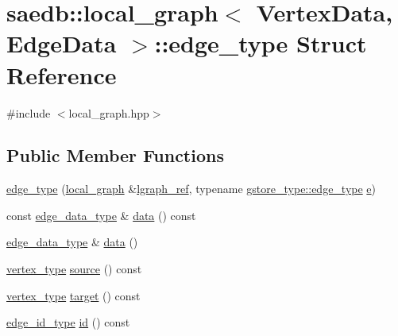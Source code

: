\hypertarget{structsaedb_1_1local__graph_1_1edge__type}{\section{saedb\-:\-:local\-\_\-graph$<$ Vertex\-Data, Edge\-Data $>$\-:\-:edge\-\_\-type Struct Reference}
\label{da/d9c/structsaedb_1_1local__graph_1_1edge__type}
}


{\ttfamily \#include $<$local\-\_\-graph.\-hpp$>$}

\subsection*{Public Member Functions}
\begin{DoxyCompactItemize}
\item 
\hyperlink{structsaedb_1_1local__graph_1_1edge__type_a9d564cdbeaada46731ad31388589c3d0}{edge\-\_\-type} (\hyperlink{classsaedb_1_1local__graph}{local\-\_\-graph} \&\hyperlink{structsaedb_1_1local__graph_1_1edge__type_a10710816a9c91ab177cdcbdc1b02c13b}{lgraph\-\_\-ref}, typename \hyperlink{classsaedb_1_1graph__storage_1_1edge__type}{gstore\-\_\-type\-::edge\-\_\-type} \hyperlink{structsaedb_1_1local__graph_1_1edge__type_acb4410e19f8158ef74a2df433c104fea}{e})
\item 
const \hyperlink{classsaedb_1_1local__graph_a40ea4338f0e7fcd205b83b41e3f86e8c}{edge\-\_\-data\-\_\-type} \& \hyperlink{structsaedb_1_1local__graph_1_1edge__type_a125fe14664111369dc8527eb54eaa9c8}{data} () const 
\item 
\hyperlink{classsaedb_1_1local__graph_a40ea4338f0e7fcd205b83b41e3f86e8c}{edge\-\_\-data\-\_\-type} \& \hyperlink{structsaedb_1_1local__graph_1_1edge__type_a5e7f17d52fa8e36b8c64da72735a661e}{data} ()
\item 
\hyperlink{structsaedb_1_1local__graph_1_1vertex__type}{vertex\-\_\-type} \hyperlink{structsaedb_1_1local__graph_1_1edge__type_acdc7a18d8269f19df423851910063fcd}{source} () const 
\item 
\hyperlink{structsaedb_1_1local__graph_1_1vertex__type}{vertex\-\_\-type} \hyperlink{structsaedb_1_1local__graph_1_1edge__type_a054d4288334de6734e2ca76c179433f2}{target} () const 
\item 
\hyperlink{classsaedb_1_1local__graph_a947191fe9f882212df867404c43d1c7a}{edge\-\_\-id\-\_\-type} \hyperlink{structsaedb_1_1local__graph_1_1edge__type_a23120b22e0bcaeaaad49b3d6f247980d}{id} () const 
\end{DoxyCompactItemize}
